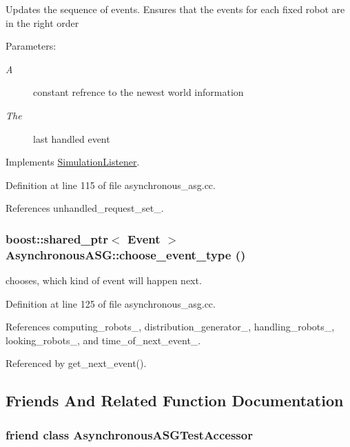 Updates the sequence of events. Ensures that the events for each fixed robot are in the right order \begin{Desc}
\item[Parameters:]
\begin{description}
\item[{\em A}]constant refrence to the newest world information \item[{\em The}]last handled event \end{description}
\end{Desc}


Implements \hyperlink{class_simulation_listener_f1b53fbefce7830648bb059dfd0f18b4}{SimulationListener}.

Definition at line 115 of file asynchronous\_\-asg.cc.

References unhandled\_\-request\_\-set\_\-.\hypertarget{class_asynchronous_a_s_g_a8a58e515bb574cc93682d8821682e73}{
\subsubsection[choose\_\-event\_\-type]{\setlength{\rightskip}{0pt plus 5cm}boost::shared\_\-ptr$<$ Event $>$ AsynchronousASG::choose\_\-event\_\-type ()}}
\label{class_asynchronous_a_s_g_a8a58e515bb574cc93682d8821682e73}


chooses, which kind of event will happen next. 

Definition at line 125 of file asynchronous\_\-asg.cc.

References computing\_\-robots\_\-, distribution\_\-generator\_\-, handling\_\-robots\_\-, looking\_\-robots\_\-, and time\_\-of\_\-next\_\-event\_\-.

Referenced by get\_\-next\_\-event().

\subsection{Friends And Related Function Documentation}
\hypertarget{class_asynchronous_a_s_g_9fbe3b2400008b3dab55bea0e55a5332}{
\subsubsection[AsynchronousASGTestAccessor]{\setlength{\rightskip}{0pt plus 5cm}friend class AsynchronousASGTestAccessor}}
\label{class_asynchronous_a_s_g_9fbe3b2400008b3dab55bea0e55a5332}


